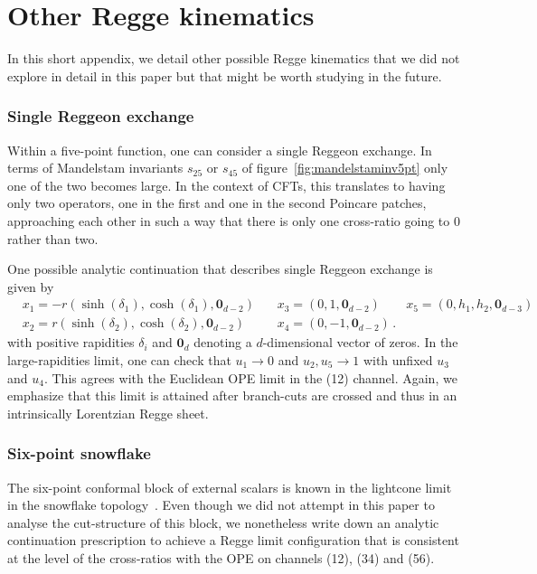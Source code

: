 \section{Other Regge kinematics}
\label{sec:otherregge}
In this short appendix, we detail other possible Regge kinematics that we did not explore in detail in this paper but that might be worth studying in the future.

\subsubsection*{Single Reggeon exchange}

Within a five-point function, one can consider a single Reggeon exchange. In terms of Mandelstam invariants $s_{25}$ or $s_{45}$ of figure~\ref{fig:mandelstaminv5pt} only one of the two becomes large. In the context of CFTs, this translates to having only two operators, one in the first and one in the second Poincare patches, approaching each other in such a way that there is only one cross-ratio going to $0$ rather than two.

One possible analytic continuation that describes single Reggeon exchange is given by
\begin{align}
   & x_{1}= -r\left(\sinh(\delta_1), \cosh(\delta_1), \textbf{0}_{d-2} \right)\, &  & x_{3}= \left(0, 1, \textbf{0}_{d-2} \right)\,   & x_5=(0,h_1,h_2,\textbf{0}_{d-3})\nonumber \\
   & x_{2}= r\left(\sinh(\delta_2),  \cosh(\delta_2), \textbf{0}_{d-2} \right)\, &  & x_{4}= \left(0, -1, \textbf{0}_{d-2} \right)\,.
\end{align}
with positive rapidities $\delta_i$ and $\textbf{0}_{d}$ denoting a $d$-dimensional vector of zeros. In the large-rapidities limit, one can check that $u_1 \to 0$ and $u_2, u_5 \to 1$ with unfixed $u_3$ and $u_4$. This agrees with the Euclidean OPE limit in the (12) channel. Again, we emphasize that this limit is attained after branch-cuts are crossed and thus in an intrinsically Lorentzian Regge sheet.

\subsubsection*{Six-point snowflake}

The six-point conformal block of external scalars is known in the lightcone limit in the snowflake topology~\cite{Antunes:2021kmm}. Even though we did not attempt in this paper to analyse the cut-structure of this block, we nonetheless write down an analytic continuation prescription to achieve a Regge limit configuration that is consistent at the level of the cross-ratios with the OPE on channels (12), (34) and (56).

